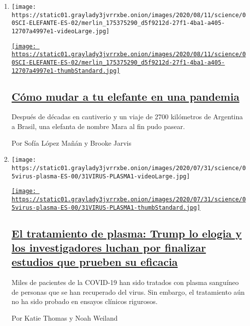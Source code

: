 \begin{enumerate}
\def\labelenumi{\arabic{enumi}.}
\item
  \texttt{[image: https://static01.graylady3jvrrxbe.onion/images/2020/08/11/science/00SCI-ELEFANTE-ES-02/merlin\_175375290\_d5f9212d-27f1-4ba1-a405-12707a4997e1-videoLarge.jpg]}

  \href{/es/2020/08/09/espanol/ciencia-y-tecnologia/mara-elefante-argentina.html}{\texttt{[image: https://static01.graylady3jvrrxbe.onion/images/2020/08/11/science/00SCI-ELEFANTE-ES-02/merlin\_175375290\_d5f9212d-27f1-4ba1-a405-12707a4997e1-thumbStandard.jpg]}}

  \hypertarget{cuxf3mo-mudar-a-tu-elefante-en-una-pandemia}{%
  \subsection{\texorpdfstring{\href{/es/2020/08/09/espanol/ciencia-y-tecnologia/mara-elefante-argentina.html}{Cómo
  mudar a tu elefante en una
  pandemia}}{Cómo mudar a tu elefante en una pandemia}}\label{cuxf3mo-mudar-a-tu-elefante-en-una-pandemia}}

  Después de décadas en cautiverio y un viaje de 2700 kilómetros de
  Argentina a Brasil, una elefanta de nombre Mara al fin pudo pasear.

  Por Sofía López Mañán y Brooke Jarvis
\item
  \texttt{[image: https://static01.graylady3jvrrxbe.onion/images/2020/07/31/science/05virus-plasma-ES-00/31VIRUS-PLASMA1-videoLarge.jpg]}

  \href{/es/2020/08/07/espanol/ciencia-y-tecnologia/plasma-convaleciente-coronavirus.html}{\texttt{[image: https://static01.graylady3jvrrxbe.onion/images/2020/07/31/science/05virus-plasma-ES-00/31VIRUS-PLASMA1-thumbStandard.jpg]}}

  \hypertarget{el-tratamiento-de-plasma-trump-lo-elogia-y-los-investigadores-luchan-por-finalizar-estudios-que-prueben-su-eficacia}{%
  \subsection{\texorpdfstring{\href{/es/2020/08/07/espanol/ciencia-y-tecnologia/plasma-convaleciente-coronavirus.html}{El
  tratamiento de plasma: Trump lo elogia y los investigadores luchan por
  finalizar estudios que prueben su
  eficacia}}{El tratamiento de plasma: Trump lo elogia y los investigadores luchan por finalizar estudios que prueben su eficacia}}\label{el-tratamiento-de-plasma-trump-lo-elogia-y-los-investigadores-luchan-por-finalizar-estudios-que-prueben-su-eficacia}}

  Miles de pacientes de la COVID-19 han sido tratados con plasma
  sanguíneo de personas que se han recuperado del virus. Sin embargo, el
  tratamiento aún no ha sido probado en ensayos clínicos rigurosos.

  Por Katie Thomas y Noah Weiland
\end{enumerate}


